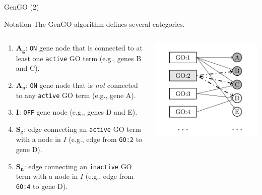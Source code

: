 \documentclass{beamer}
\begin{document}
\begin{frame}{GenGO (2)}
\begin{mybluebox}{Notation}
The GenGO algorithm defines several categories.
\end{mybluebox}

\begin{columns}

\begin{scriptsize}
\begin{enumerate}
\item $\mathbf{A_g}$: \texttt{ON} gene node that is connected to at least one
  \texttt{active} GO term (e.g., genes B and C).
\item $\mathbf{A_n}$: \texttt{ON} gene node that is \textit{not} connected to any
  \texttt{active} GO term (e.g., gene A).
\item $\mathbf{I}$: \texttt{OFF} gene node (e.g., genes D and E).
\item $\mathbf{S_g}$: edge connecting  an \texttt{active} GO term with a node
  in $I$ (e.g., edge from \texttt{GO:2} to gene D).
\item $\mathbf{S_n}$: edge connecting  an \texttt{inactive} GO term with a node
  in $I$ (e.g., edge from \texttt{GO:4} to gene D).
\end{enumerate}
\end{scriptsize}
 \includegraphics[width=1\textwidth]{./img/genGO.png}
\end{columns}

\end{frame}
\end{document}

